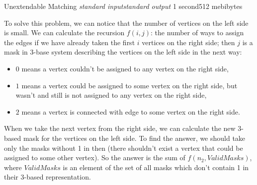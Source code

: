 \begin{problem}{Unextendable Matching}
{\textsl{standard input}}{\textsl{standard output}}
{1 second}{512 mebibytes}{}

To solve this problem, we can notice that the number of vertices
on the left side is small.
We can calculate the recursion $f(i,j)$: the number of ways to assign
the edges if we have already taken the first $i$ vertices on the right side;
then $j$ is a mask in 3-base system describing the vertices on the left side
in the next way:

\begin{itemize}
\item $0$ means a vertex couldn't be assigned to any vertex on the right side,
\item $1$ means a vertex could be assigned to some vertex on the right side,
but wasn't and still is not assigned to any vertex on the right side,
\item $2$ means a vertex is connected with edge to some vertex
on the right side.
\end{itemize}

When we take the next vertex from the right side,
we can calculate the new 3-based mask for the vertices on the left side.
To find the answer, we should take only the masks without 1 in then
(there shouldn't exist a vertex that could be assigned to some other vertex).
So the answer is the sum of $f(n_2,ValidMasks)$, where $ValidMasks$ is
an element of the set of all masks which don't contain 1 in their
3-based representation.

\end{problem}
